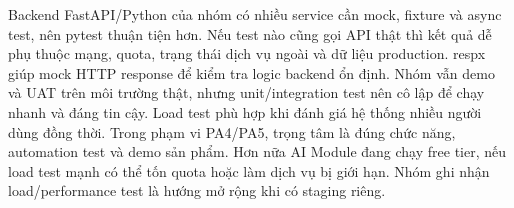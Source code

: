 {}Backend FastAPI/Python của nhóm có nhiều service cần mock, fixture và async test, nên pytest thuận tiện hơn.\markdownRendererInterblockSeparator
{}
\markdownRendererSectionEnd \markdownRendererSectionBegin
{}\markdownRendererInterblockSeparator
{}Nếu test nào cũng gọi API thật thì kết quả dễ phụ thuộc mạng, quota, trạng thái dịch vụ ngoài và dữ liệu production.\markdownRendererParagraphSeparator
{}respx giúp mock HTTP response để kiểm tra logic backend ổn định. Nhóm vẫn demo và UAT trên môi trường thật, nhưng unit/integration test nên cô lập để chạy nhanh và đáng tin cậy.\markdownRendererInterblockSeparator
{}
\markdownRendererSectionEnd \markdownRendererSectionBegin
{}\markdownRendererInterblockSeparator
{}Load test phù hợp khi đánh giá hệ thống nhiều người dùng đồng thời. Trong phạm vi PA4/PA5, trọng tâm là đúng chức năng, automation test và demo sản phẩm.\markdownRendererParagraphSeparator
{}Hơn nữa AI Module đang chạy free tier, nếu load test mạnh có thể tốn quota hoặc làm dịch vụ bị giới hạn. Nhóm ghi nhận load/performance test là hướng mở rộng khi có staging riêng.\markdownRendererInterblockSeparator
{}\markdownRendererThematicBreak{}\markdownRendererInterblockSeparator
{}
\markdownRendererSectionEnd 
\markdownRendererSectionEnd \markdownRendererSectionBegin
{}\markdownRendererInterblockSeparator
